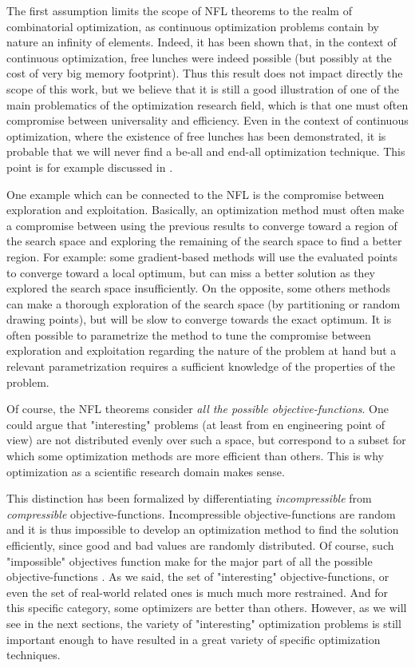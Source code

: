 The first assumption limits the scope of NFL theorems to the realm of combinatorial optimization, as continuous optimization problems contain by nature an infinity of elements. Indeed, it has been shown that, in the context of continuous optimization, free lunches were indeed possible \cite{Auger-s00453-008-9244-5} (but possibly at the cost of very big memory footprint). Thus this result does not impact directly the scope of this work, but we believe that it is still a good illustration of one of the main problematics of the optimization research field, which is that one must often compromise between universality and efficiency. Even in the context of continuous optimization, where the existence of free lunches has been demonstrated, it is probable that we will never find a be-all and end-all optimization technique. This point is for example discussed in \cite{Doe05}.

One example which can be connected to the NFL is the compromise between exploration and exploitation. Basically, an optimization method must often make a compromise between using the previous results to converge toward a region of the search space and exploring the remaining of the search space to find a better region.
For example: some gradient-based methods will use the evaluated points to converge toward a local optimum, but can miss a better solution as they explored the search space insufficiently. On the opposite, some others methods can make a thorough exploration of the search space (by partitioning or random drawing points), but will be slow to converge towards the exact optimum.
It is often possible to parametrize the method to tune the compromise between exploration and exploitation regarding the nature of the problem at hand but a relevant parametrization requires a sufficient knowledge of the properties of the problem.

Of course, the NFL theorems consider \emph{all the possible objective-functions}. One could argue that "interesting" problems (at least from en engineering point of view) are not distributed evenly over such a space, but correspond to a subset for which some optimization methods are more efficient than others. This is why optimization as a scientific research domain makes sense. 

This distinction has been formalized by differentiating \emph{incompressible} from \emph{compressible} objective-functions. Incompressible objective-functions are random and it is thus impossible to develop an optimization method to find the solution efficiently, since good and bad values are randomly distributed. Of course, such "impossible" objectives function make for the major part of all the possible objective-functions \cite{English:3-540-45356-3_7}.
As we said, the set of "interesting" objective-functions, or even the set of real-world related ones is much much more restrained. And for this specific category, some optimizers are better than others. 
However, as we will see in the next sections, the variety of "interesting" optimization problems is still important enough to have resulted in a great variety of specific optimization techniques.

